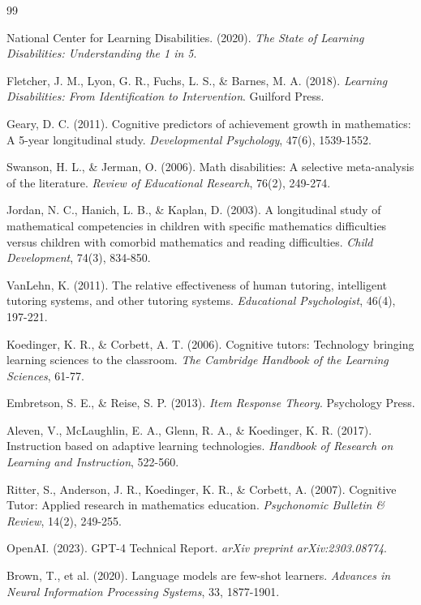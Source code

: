 \documentclass[11pt]{article}
\begin{document}
\begin{thebibliography}{99}

National Center for Learning Disabilities. (2020). \textit{The State of Learning Disabilities: Understanding the 1 in 5}.

Fletcher, J. M., Lyon, G. R., Fuchs, L. S., \& Barnes, M. A. (2018). \textit{Learning Disabilities: From Identification to Intervention}. Guilford Press.

Geary, D. C. (2011). Cognitive predictors of achievement growth in mathematics: A 5-year longitudinal study. \textit{Developmental Psychology}, 47(6), 1539-1552.

Swanson, H. L., \& Jerman, O. (2006). Math disabilities: A selective meta-analysis of the literature. \textit{Review of Educational Research}, 76(2), 249-274.

Jordan, N. C., Hanich, L. B., \& Kaplan, D. (2003). A longitudinal study of mathematical competencies in children with specific mathematics difficulties versus children with comorbid mathematics and reading difficulties. \textit{Child Development}, 74(3), 834-850.

VanLehn, K. (2011). The relative effectiveness of human tutoring, intelligent tutoring systems, and other tutoring systems. \textit{Educational Psychologist}, 46(4), 197-221.

Koedinger, K. R., \& Corbett, A. T. (2006). Cognitive tutors: Technology bringing learning sciences to the classroom. \textit{The Cambridge Handbook of the Learning Sciences}, 61-77.

Embretson, S. E., \& Reise, S. P. (2013). \textit{Item Response Theory}. Psychology Press.

Aleven, V., McLaughlin, E. A., Glenn, R. A., \& Koedinger, K. R. (2017). Instruction based on adaptive learning technologies. \textit{Handbook of Research on Learning and Instruction}, 522-560.

Ritter, S., Anderson, J. R., Koedinger, K. R., \& Corbett, A. (2007). Cognitive Tutor: Applied research in mathematics education. \textit{Psychonomic Bulletin \& Review}, 14(2), 249-255.

OpenAI. (2023). GPT-4 Technical Report. \textit{arXiv preprint arXiv:2303.08774}.

Brown, T., et al. (2020). Language models are few-shot learners. \textit{Advances in Neural Information Processing Systems}, 33, 1877-1901.


\end{thebibliography}
\end{document}
